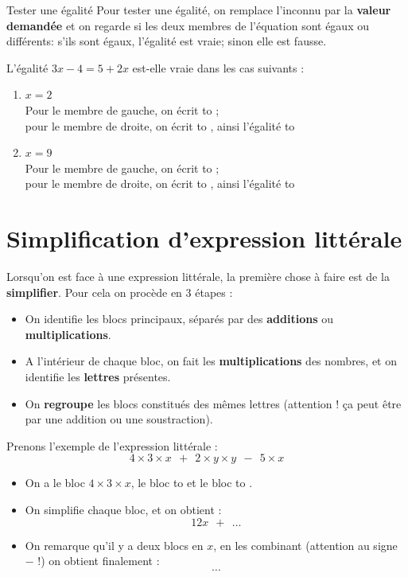 \documentclass[12pt]{article}
\newif\iftrou\troutrue
\newlength{\trouwidth}
\newcommand{\trou}[1]{%
	\iftrou%
	\settowidth{\trouwidth}{#1}%
	\hbox to \trouwidth{\dotfill}%
	\else%
	#1%
	\fi}
\begin{document}
\begin{prop}{Tester une égalité}{}
	Pour tester une égalité, on remplace l'inconnu par la \textbf{valeur demandée} et on regarde si les deux membres de l'équation sont égaux ou différents: s'ils sont égaux, l'égalité est vraie; sinon elle est fausse.
\end{prop}

\begin{ex}{}{}
	L’égalité $3x-4 = 5+2x$ est-elle vraie dans les cas suivants :
	\begin{enumerate}
		\item $x=2$\\
		Pour le membre de gauche, on écrit \trou{$3\times 2 - 4 = 0$};\\
		pour le membre de droite, on écrit \trou{$5+2\times 2 = 9$}, ainsi l'égalité \trou{est fausse.}
		\item $x=9$\\
		Pour le membre de gauche, on écrit \trou{$3\times 9 - 4 = 23$};\\
		pour le membre de droite, on écrit \trou{$5+2\times 9 = 23$}, ainsi l'égalité \trou{ est  vraie.}
	\end{enumerate}
\end{ex}

\newpage

\section{Simplification d'expression littérale}

\begin{rem}{}{}
Lorsqu'on est face à une expression littérale, la première chose à faire est de la \textbf{simplifier}. Pour cela on procède en 3 étapes :
\begin{itemize}
\item[1.] On identifie les blocs principaux, séparés par des \textbf{additions} ou \textbf{multiplications}.
\item[2.] A l'intérieur de chaque bloc, on fait les \textbf{multiplications} des nombres, et on identifie les \textbf{lettres} présentes.
\item[3.] On \textbf{regroupe} les blocs constitués des mêmes lettres (attention ! ça peut être par une addition ou une soustraction).
\end{itemize}
\end{rem}


\begin{ex}{}{}
Prenons l'exemple de l'expression littérale :
$$ 4 \times 3 \times x ~~+~~ 2  \times y \times y  ~~-~~ 5 \times x $$
\begin{itemize}
\item[1.] On a le bloc $4 \times 3 \times x$, le bloc \trou{$2 \times y \times y$} et le bloc \trou{$5 \times x$}.
\item[2.] On simplifie chaque bloc, et on obtient :
$$ 12 x ~~+~~ \dots $$ %
\item[3.] On remarque qu'il y a deux blocs en $x$, en les combinant (attention au signe $-$ !) on obtient finalement :
$$ \dots $$ %
\end{itemize}
\end{ex}
\end{document}
